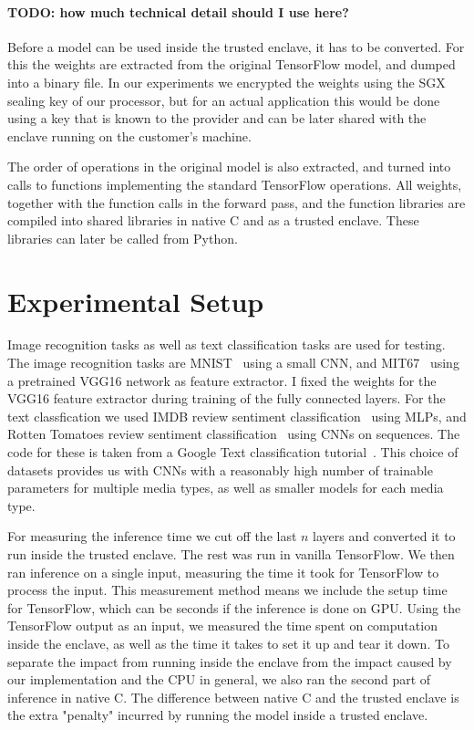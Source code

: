 \documentclass[11pt,twocolumn]{article}
\newcommand{\tf}{TensorFlow}
\begin{document}
\paragraph{TODO: how much technical detail should I use here?}
Before a model can be used inside the trusted enclave, it has to be converted.
For this the weights are extracted from the original \tf{} model, and dumped into a binary file.
In our experiments we encrypted the weights using the SGX sealing key of our processor, but for an actual application this would be done using a key that is known to the provider and can be later shared with the enclave running on the customer's machine.

The order of operations in the original model is also extracted, and turned into calls to functions implementing the standard \tf{} operations.
All weights, together with the function calls in the forward pass, and the function libraries are compiled into shared libraries in native C and as a trusted enclave.
These libraries can later be called from Python.

\section{Experimental Setup}
\label{sec:setup}

Image recognition tasks as well as text classification tasks are used for testing.
The image recognition tasks are MNIST~\cite{noauthor_mnist_nodate} using a small CNN, and MIT67~\cite{quattoni_recognizing_nodate} using a pretrained VGG16 network as feature extractor.
I fixed the weights for the VGG16 feature extractor during training of the fully connected layers.
For the text classfication we used IMDB review sentiment classification~\cite{maas_learning_2011} using MLPs, and Rotten Tomatoes review sentiment classification~\cite{noauthor_sentiment_nodate} using CNNs on sequences.
The code for these is taken from a Google Text classification tutorial~\cite{noauthor_googleeng-edu_nodate}.
This choice of datasets provides us with CNNs with a reasonably high number of trainable parameters for multiple media types, as well as smaller models for each media type.

For measuring the inference time we cut off the last $n$ layers and converted it to run inside the trusted enclave.
The rest was run in vanilla \tf{}.
We then ran inference on a single input, measuring the time it took for \tf{} to process the input.
This measurement method means we include the setup time for \tf{}, which can be seconds if the inference is done on GPU.
Using the \tf{} output as an input, we measured the time spent on computation inside the enclave, as well as the time it takes to set it up and tear it down.
To separate the impact from running inside the enclave from the impact caused by our implementation and the CPU in general, we also ran the second part of inference in native C.
The difference between native C and the trusted enclave is the extra "penalty" incurred by running the model inside a trusted enclave.
\end{document}
